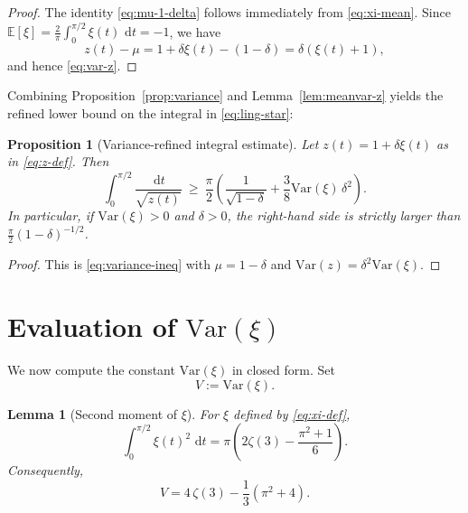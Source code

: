 \documentclass[11pt]{article}
\newtheorem{lemma}[theorem]{Lemma}
\newtheorem{proposition}[theorem]{Proposition}
\newcommand{\E}{\mathbb{E}}
\newcommand{\Var}{\mathrm{Var}}
\newcommand{\dd}{\,\mathrm{d}}
\begin{document}
\begin{proof}
The identity \eqref{eq:mu-1-delta} follows immediately from \eqref{eq:xi-mean}.
Since $\E[\xi]=\frac{2}{\pi}\int_0^{\pi/2}\xi(t)\,\dd t=-1$, we have
\begin{equation}
z(t)-\mu = 1+\delta\xi(t) - (1-\delta)=\delta(\xi(t)+1),
\end{equation}
and hence \eqref{eq:var-z}.
\end{proof}

Combining Proposition~\ref{prop:variance} and Lemma~\ref{lem:meanvar-z} yields the refined lower bound on the integral in \eqref{eq:ling-star}:

\begin{proposition}[Variance-refined integral estimate]
\label{prop:refined-integral}
Let $z(t)=1+\delta\xi(t)$ as in \eqref{eq:z-def}.
Then
\begin{equation}
\label{eq:integral-refined}
\int_{0}^{\pi/2}\frac{\dd t}{\sqrt{z(t)}}
\ \ge\
\frac{\pi}{2}\left(\frac{1}{\sqrt{1-\delta}}+\frac{3}{8}\Var(\xi)\,\delta^2\right).
\end{equation}
In particular, if $\Var(\xi)>0$ and $\delta>0$, the right-hand side is strictly larger than $\frac{\pi}{2}(1-\delta)^{-1/2}$.
\end{proposition}

\begin{proof}
This is \eqref{eq:variance-ineq} with $\mu=1-\delta$ and $\Var(z)=\delta^2\Var(\xi)$.
\end{proof}

\section{Evaluation of \texorpdfstring{$\Var(\xi)$}{Var(xi)}}

We now compute the constant $\Var(\xi)$ in closed form.
Set
\begin{equation}
V := \Var(\xi).
\end{equation}

\begin{lemma}[Second moment of $\xi$]
\label{lem:xi-secondmoment}
For $\xi$ defined by \eqref{eq:xi-def},
\begin{equation}
\label{eq:xi-square-integral}
\int_{0}^{\pi/2}\xi(t)^2\,\dd t
=
\pi\left(2\zeta(3)-\frac{\pi^2+1}{6}\right).
\end{equation}
Consequently,
\begin{equation}
\label{eq:V-closedform}
V = 4\,\zeta(3)-\frac{1}{3}(\pi^2+4).
\end{equation}
\end{lemma}
\end{document}
